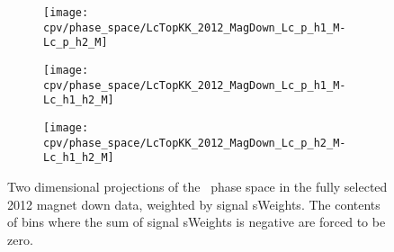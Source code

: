 \begin{figure}
  \begin{subfigure}{0.5\textwidth}
    \texttt{[image: cpv/phase\_space/LcTopKK\_2012\_MagDown\_Lc\_p\_h1\_M-Lc\_p\_h2\_M]}
    \label{fig:cpv:phsp:data:pKK:msqphm_msqphp}
  \end{subfigure}
  \begin{subfigure}{0.5\textwidth}
    \texttt{[image: cpv/phase\_space/LcTopKK\_2012\_MagDown\_Lc\_p\_h1\_M-Lc\_h1\_h2\_M]}
    \label{fig:cpv:phsp:data:pKK:msqphp_msqhh}
  \end{subfigure}
  \begin{subfigure}{0.5\textwidth}
    \texttt{[image: cpv/phase\_space/LcTopKK\_2012\_MagDown\_Lc\_p\_h2\_M-Lc\_h1\_h2\_M]}
    \label{fig:cpv:phsp:data:pKK:msqpp_msqhh}
  \end{subfigure}
  \caption{%
    Two dimensional projections of the \LcTopKK\ phase space in the fully 
    selected 2012 magnet down data, weighted by signal sWeights.
    The contents of bins where the sum of signal sWeights is negative are 
    forced to be zero.
  }
  \label{fig:cpv:phsp:data_2D:pKK}
\end{figure}


